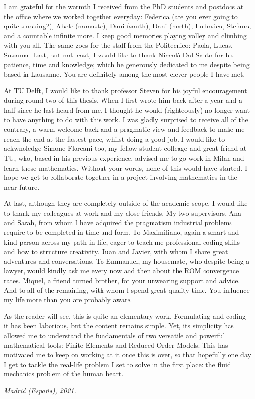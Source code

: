 \documentclass[thesis.tex]{subfiles}
\begin{document}
I am grateful for the warmth I received from the PhD students and postdocs 
at the office where we worked together everyday: 
Federica (are you ever going to quite smoking?), 
Abele (namaste), 
Dani (south), 
Dani (north), 
Ludovica, 
Stefano, 
and a countable infinite more.
I keep good memories playing volley and climbing with you all.
The same goes for the staff from the Politecnico: 
Paola, 
Lucas, 
Susanna.
Last, but not least, I would like to thank Niccolò Dal Santo for his patience, time and knowledge; 
which he generously dedicated to me despite being based in Lausanne. 
You are definitely among the most clever people I have met.

At TU Delft, I would like to thank professor Steven 
for his joyful encouragement during round two of this thesis.
When I first wrote him back after a year and a half since he last heard from me, 
I thought he would (righteously) no longer want to have anything to do with this work.
I was gladly surprised to receive all of the contrary, 
a warm welcome back and a pragmatic view and feedback to make me reach the end at the fastest pace, 
whilst doing a good job.
I would like to ackwnoledge Simone Floreani too, my fellow student colleage and great friend at TU,
who, based in his previous experience, 
advised me to go work in Milan and learn these mathematics.
Without your words, none of this would have started. 
I hope we get to collaborate together in a project involving mathematics in the near future.

At last, although they are completely outside of the academic scope, 
I would like to thank my colleagues at work and my close friends.
My two supervisors, Ana and Sarah, from whom I have adquired 
the pragmatism industrial problems require to be completed in time and form.
To Maximiliano, again a smart and kind person across my path in life, 
eager to teach me professional coding skills and how to structure creativity.
Juan and Javier, with whom I share great adventures and conversations.
To Emmanuel, my housemate, who despite being a lawyer, 
would kindly ask me every now and then about the ROM convergence rates.
Miquel, a friend turned brother, for your unwearing support and advice.
And to all of the remaining, with whom I spend great quality time.
You influence my life more than you are probably aware.

As the reader will see, this is quite an elementary work.
Formulating and coding it has been laborious, but the content remains simple.
Yet, its simplicity has allowed me to understand the fundamentals of 
two versatile and powerful mathematical tools: 
Finite Elements and Reduced Order Models.
This has motivated me to keep on working at it once this is over, 
so that hopefully one day I get to tackle the real-life problem 
I set to solve in the first place: 
the fluid mechanics problem of the human heart.

\begin{flushright}
    \vspace{5mm}
    \textit{Madrid (España), 2021.}    
\end{flushright}
\end{document}
